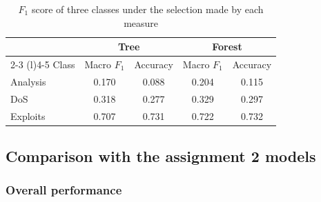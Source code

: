 \documentclass[conference,10pt]{IEEEtran}
\begin{document}
\begin{table}[t]
  \centering
  \caption{$F_1$ score of three classes under the selection made by each measure}
  \label{tab:measure_classes}
  \begin{tabular}{lcccc}
    \toprule
    & \multicolumn{2}{c}{Tree} & \multicolumn{2}{c}{Forest} \\
    \cmidrule(lr){2-3} \cmidrule(l){4-5}
    Class & Macro $F_1$ & Accuracy & Macro $F_1$ & Accuracy \\
    \midrule
    Analysis & 0.170 & 0.088 & 0.204 & 0.115 \\
    DoS      & 0.318 & 0.277 & 0.329 & 0.297 \\
    Exploits & 0.707 & 0.731 & 0.722 & 0.732 \\
    \bottomrule
  \end{tabular}
\end{table}

\subsection{Comparison with the assignment 2 models}
\label{subsec:res_comparison}

\subsubsection{Overall performance}
\end{document}
